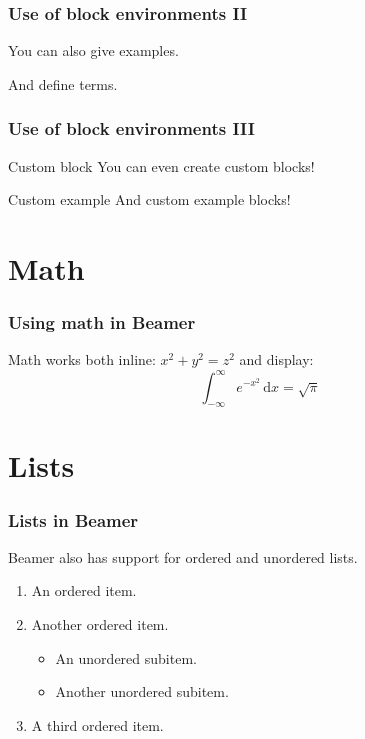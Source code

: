 \documentclass{beamer}
\begin{document}
\begin{frame}
  \frametitle{Use of block environments II}
  \begin{example}
    You can also give examples.
  \end{example}

  \begin{definition}
    And define \alert{terms}.
  \end{definition}
\end{frame}

\begin{frame}
  \frametitle{Use of block environments III}
  \begin{block}{Custom block}
    You can even create custom blocks!
  \end{block}

  \begin{exampleblock}{Custom example}
    And custom example blocks!
  \end{exampleblock}
\end{frame}

\section{Math}
\begin{frame}
  \frametitle{Using math in Beamer}

  Math works both inline: $x^{2} + y^{2} = z^{2}$
  and display:
  \[ \int_{-\infty}^{\infty} e^{-x^{2}} \, \mathrm{d}x = \sqrt{\pi} \]
\end{frame}

\section{Lists}
\begin{frame}
  \frametitle{Lists in Beamer}
  Beamer also has support for ordered and unordered lists.

  \begin{enumerate}
  \item An ordered item.
  \item Another ordered item.
    \begin{itemize}
    \item An unordered subitem.
    \item Another unordered subitem.
    \end{itemize}
  \item A third ordered item.
  \end{enumerate}
\end{frame}
\end{document}
